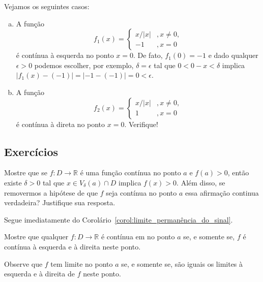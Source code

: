 \begin{ex}
  Vejamos os seguintes casos:
  \begin{enumerate}[a)]
    \item A função
      \begin{equation}
        f_1(x) = \left\{
          \begin{array}{ll}
            x/|x| &, x\neq 0,\\
            -1 &, x=0
          \end{array}
\right.
      \end{equation}
é contínua à esquerda no ponto $x=0$. De fato, $f_1(0)=-1$ e dado qualquer $\epsilon>0$ podemos escolher, por exemplo, $\delta = \epsilon$ tal que $0<0-x<\delta$ implica $|f_1(x)-(-1)|=|-1-(-1)|=0<\epsilon$.
    \item A função
      \begin{equation}
        f_2(x) = \left\{
          \begin{array}{ll}
            x/|x| &, x\neq 0,\\
            1 &, x=0
          \end{array}
\right.
      \end{equation}
é contínua à direta no ponto $x=0$. Verifique!
  \end{enumerate}
\end{ex}

\subsection*{Exercícios}

\begin{exer}
  Mostre que se $f:D\to\mathbb{R}$ é uma função contínua no ponto $a$ e $f(a)>0$, então existe $\delta>0$ tal que $x\in V_\delta(a)\cap D$ implica $f(x)>0$. Além disso, se removermos a hipótese de que $f$ seja contínua no ponto $a$ essa afirmação continua verdadeira? Justifique sua resposta.
\end{exer}
\begin{resp}
  Segue imediatamente do Corolário~\ref{corol:limite_permanência_do_sinal}.
\end{resp}

\begin{exer}
  Mostre que qualquer $f:D\to\mathbb{R}$ é contínua em no ponto $a$ se, e somente se, $f$ é contínua à esquerda e à direita neste ponto.
\end{exer}
\begin{resp}
  Observe que $f$ tem limite no ponto $a$ se, e somente se, são iguais os limites à esquerda e à direita de $f$ neste ponto.
\end{resp}

